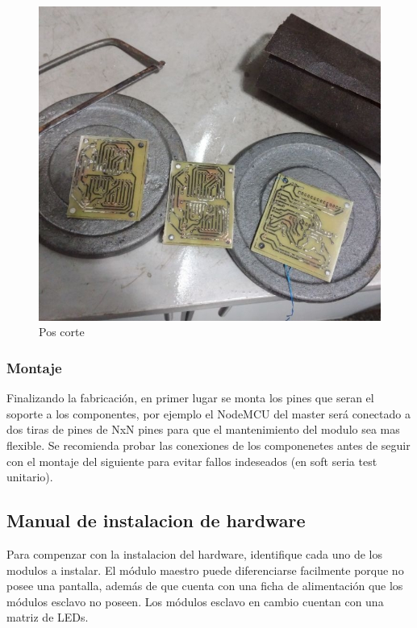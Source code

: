 \begin{figure}[ht!]
	\centering
	\includegraphics[width=0.7\linewidth]{imagenes/pcbeando/pos-corte.jpeg}
	\caption{Pos corte}
	\label{fig:pos-corte}
\end{figure}

\subsubsection{Montaje}

{ \color{red} Finalizando la fabricación, en primer lugar se monta los pines que seran el soporte a los componentes, por ejemplo el NodeMCU del master será conectado a dos tiras de pines de NxN pines para que el mantenimiento del modulo sea mas flexible.
Se recomienda probar las conexiones de los componenetes antes de seguir con el montaje del siguiente para evitar fallos indeseados (en soft seria test unitario).}



\subsection{Manual de instalacion de hardware}


Para compenzar con la instalacion del hardware, identifique cada uno de los modulos a instalar. El módulo maestro puede diferenciarse facilmente porque no posee una pantalla, además de que cuenta con una ficha de alimentación que los módulos esclavo no poseen. Los módulos esclavo en cambio cuentan con una matriz de LEDs.

